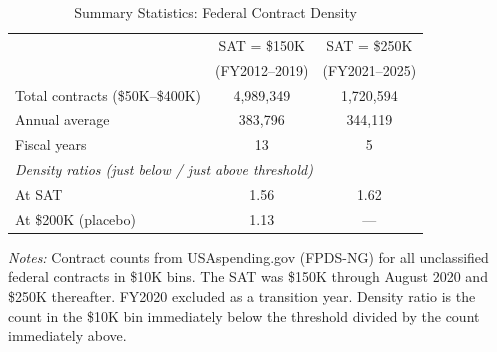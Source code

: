 \begin{table}[t]
\centering
\caption{Summary Statistics: Federal Contract Density}
\label{tab:summary}
\begin{threeparttable}
\begin{tabular}{lcc}
\toprule
 & \multicolumn{1}{c}{SAT = \$150K} & \multicolumn{1}{c}{SAT = \$250K} \\
 & \multicolumn{1}{c}{(FY2012--2019)} & \multicolumn{1}{c}{(FY2021--2025)} \\
\midrule
Total contracts (\$50K--\$400K) & 4,989,349 & 1,720,594 \\
Annual average & 383,796 & 344,119 \\
Fiscal years & 13 & 5 \\
\midrule
\multicolumn{3}{l}{\textit{Density ratios (just below / just above threshold)}} \\
At SAT & 1.56 & 1.62 \\
At \$200K (placebo) & 1.13 & --- \\
\bottomrule
\end{tabular}
\begin{tablenotes}[flushleft]\small
\item \textit{Notes:} Contract counts from USAspending.gov (FPDS-NG) for all unclassified federal contracts in \$10K bins. The SAT was \$150K through August 2020 and \$250K thereafter. FY2020 excluded as a transition year. Density ratio is the count in the \$10K bin immediately below the threshold divided by the count immediately above.
\end{tablenotes}
\end{threeparttable}
\end{table}

